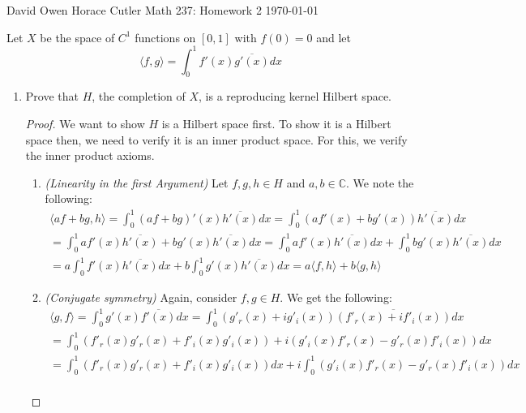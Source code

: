 \documentclass[12pt]{article}
\newenvironment{ex}[2][Exercise]{\begin{trivlist}
\item[\hskip \labelsep {\bfseries #1}\hskip \labelsep {\bfseries #2.}]}{\end{trivlist}}
\begin{document}
\noindent David Owen Horace Cutler \hfill {\Large Math 237: Homework 2} \hfill \today

\begin{ex}{4}
    Let $X$ be the space of $C^1$ functions on $[0,1]$ with $f(0) = 0$ and let
    $$\langle f, g \rangle = \int_0^1 f'(x)\overline{g'(x)} dx$$
    \begin{enumerate}[label=(\alph*)]
        \item Prove that $H$, the completion of $X$, is a reproducing kernel Hilbert space.
        \begin{proof}
            We want to show $H$ is a Hilbert space first. To show it is a Hilbert space then, we need to verify it is an inner product space. For this, we verify the inner product axioms.
            \begin{enumerate}[label=(\roman*)]
                \item \textit{(Linearity in the first Argument)} Let $f, g, h \in H$ and $a, b \in \mathbb{C}$. We note the following:
                \begin{equation}
                    \begin{aligned}
                        \langle af + bg, h \rangle = \int_0^1 (af + bg)'(x)\overline{h'(x)} dx = \int_0^1 (af'(x) + bg'(x))\overline{h'(x)} dx \\
                        = \int_0^1 af'(x)\overline{h'(x)} + bg'(x)\overline{h'(x)} dx = \int_0^1 af'(x)\overline{h'(x)} dx + \int_0^1 bg'(x)\overline{h'(x)} dx \\
                        = a\int_0^1 f'(x)\overline{h'(x)} dx + b\int_0^1 g'(x)\overline{h'(x)} dx = a\langle f, h \rangle + b\langle g, h \rangle
                    \end{aligned}
                \end{equation}
                \item \textit{(Conjugate symmetry)} Again, consider $f, g \in H$. We get the following:
                \begin{equation}
                    \begin{aligned}
                        \langle g, f\rangle = \int_0^1 g'(x)\overline{f'(x)} dx = \int_0^1 (g'_r(x) + ig'_i(x))\overline{(f'_r(x) + if'_i(x))} dx \\
                        = \int_0^1 (f'_r(x)g'_r(x) + f'_i(x)g'_i(x)) + i(g'_i(x)f'_r(x) - g'_r(x)f'_i(x)) dx \\  =  \int_0^1 (f'_r(x)g'_r(x)+ f'_i(x)g'_i(x)) dx + i \int_0^1 (g'_i(x)f'_r(x) - g'_r(x)f'_i(x)) dx \\

\end{aligned}
\end{equation}
\end{enumerate}
\end{proof}
\end{enumerate}
\end{ex}
\end{document}
